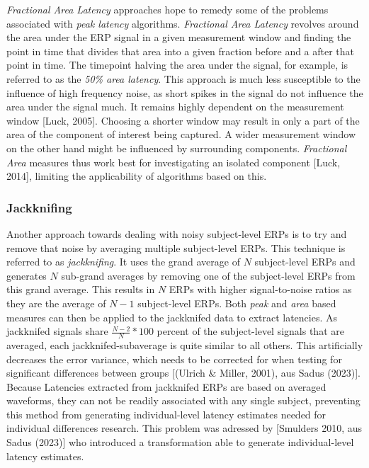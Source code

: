 \documentclass[
  man,floatsintext]{apa7}
\begin{document}
\emph{Fractional Area Latency} approaches hope to remedy some of the problems associated with \emph{peak latency} algorithms. \emph{Fractional Area Latency} revolves around the area under the ERP signal in a given measurement window and finding the point in time that divides that area into a given fraction before and a after that point in time. The timepoint halving the area under the signal, for example, is referred to as the \emph{50\% area latency}. This approach is much less susceptible to the influence of high frequency noise, as short spikes in the signal do not influence the area under the signal much. It remains highly dependent on the measurement window {[}Luck, 2005{]}. Choosing a shorter window may result in only a part of the area of the component of interest being captured. A wider measurement window on the other hand might be influenced by surrounding components. \emph{Fractional Area} measures thus work best for investigating an isolated component {[}Luck, 2014{]}, limiting the applicability of algorithms based on this.

\hypertarget{jackknifing}{%
\subsubsection{Jackknifing}\label{jackknifing}}

Another approach towards dealing with noisy subject-level ERPs is to try and remove that noise by averaging multiple subject-level ERPs. This technique is referred to as \emph{jackknifing}. It uses the grand average of \(N\) subject-level ERPs and generates \(N\) sub-grand averages by removing one of the subject-level ERPs from this grand average. This results in \(N\) ERPs with higher signal-to-noise ratios as they are the average of \(N-1\) subject-level ERPs. Both \emph{peak} and \emph{area} based measures can then be applied to the jackknifed data to extract latencies. As jackknifed signals share \(\frac{N-2}{N} * 100\) percent of the subject-level signals that are averaged, each jackknifed-subaverage is quite similar to all others. This artificially decreases the error variance, which needs to be corrected for when testing for significant differences between groups {[}(Ulrich \& Miller, 2001), aus Sadus (2023){]}. Because Latencies extracted from jackknifed ERPs are based on averaged waveforms, they can not be readily associated with any single subject, preventing this method from generating individual-level latency estimates needed for individual differences research. This problem was adressed by {[}Smulders 2010, aus Sadus (2023){]} who introduced a transformation able to generate individual-level latency estimates.
\end{document}
